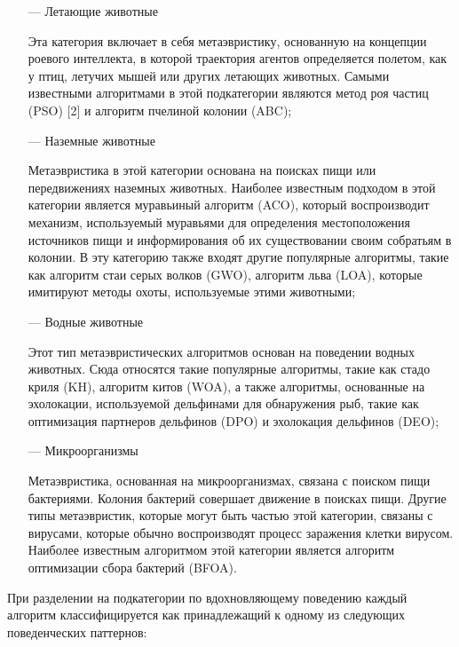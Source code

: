 \begin{itemize}
    \item[—] Летающие животные

        Эта категория включает в себя метаэвристику, основанную на
        концепции роевого интеллекта, в которой траектория агентов
        определяется полетом, как у птиц, летучих мышей или других
        летающих животных. Самыми известными алгоритмами в этой
        подкатегории являются метод роя частиц (PSO) [2] и алгоритм пчелиной
        колонии (ABC);

    \item[—] Наземные животные

        Метаэвристика в этой категории основана на поисках пищи или
        передвижениях наземных животных. Наиболее известным подходом в
        этой категории является муравьиный алгоритм (ACO),
        который воспроизводит механизм, используемый муравьями для
        определения местоположения источников пищи и
        информирования об их существовании своим собратьям в колонии.
        В эту категорию также входят другие популярные алгоритмы, такие
        как алгоритм стаи серых волков (GWO), алгоритм льва (LOA),
        которые имитируют методы охоты, используемые этими животными;

    \item[—] Водные животные

        Этот тип метаэвристических алгоритмов основан на поведении водных животных.
        Сюда относятся такие популярные алгоритмы, такие как
        стадо криля (KH), алгоритм китов (WOA), а также алгоритмы,
        основанные на эхолокации, используемой дельфинами для обнаружения рыб,
        такие как оптимизация партнеров дельфинов (DPO) и эхолокация дельфинов (DEO);

    \item[—] Микроорганизмы

        Метаэвристика, основанная на микроорганизмах, связана с поиском пищи
        бактериями. Колония бактерий совершает движение в поисках пищи. Другие
        типы метаэвристик, которые могут быть частью этой категории,
        связаны с вирусами, которые обычно воспроизводят процесс заражения клетки
        вирусом. Наиболее известным алгоритмом этой категории является алгоритм
        оптимизации сбора бактерий (BFOA).

\end{itemize}


При разделении на подкатегории по вдохновляющему поведению каждый
алгоритм классифицируется как принадлежащий к одному из следующих
поведенческих паттернов:

